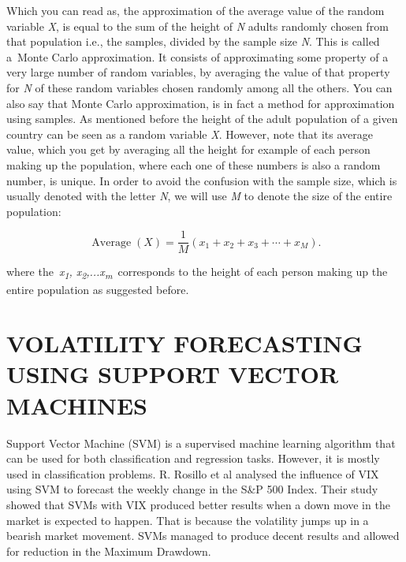 \documentclass[12pt,a4paper]{report}
\numberwithin{equation}{section}
\begin{document}
Which you can read as, the approximation of the average value of the
random variable \emph{X}, is equal to the sum of the height of \emph{N}
adults randomly chosen from that population i.e., the samples, divided
by the sample size \emph{N}. This is called a~Monte Carlo approximation.
It consists of approximating some property of a very large number of
random variables, by averaging the value of that property for \emph{N}
of these random variables chosen randomly among all the others. You can
also say that Monte Carlo approximation, is in fact a method for
approximation using samples. As mentioned before the height of the adult
population of a given country can be seen as a random variable \emph{X}.
However, note that its average value, which you get by averaging all the
height for example of each person making up the population, where each
one of these numbers is also a random number, is unique. In order to
avoid the confusion with the sample size, which is usually denoted with
the letter \emph{N}, we will use \emph{M} to denote the size of the
entire population:

\begin{equation}
\operatorname{Average}(X) = \frac{1}{M}\left(x_{1} + x_{2} + x_{3} + \cdots + x_{M}\right).
\label{eq:average-expanded}
\end{equation}



where the~\emph{x\textsubscript{1},
x\textsubscript{2},...x\textsubscript{m}}~corresponds to the height of
each person making up the entire population as suggested before.

\hypertarget{volatility--forecasting--using--support--vector--machines}{%
\section{\texorpdfstring{\textbf{VOLATILITY FORECASTING USING
SUPPORT VECTOR MACHINES}
}{VOLATILITY FORECASTING USING SUPPORT VECTOR MACHINES }}\label{volatility--forecasting--using--support--vector--machines}}

Support Vector Machine (SVM) is a supervised machine learning algorithm
that can be used for both classification and regression tasks. However,
it is mostly used in classification problems. R. Rosillo et al \cite{rosillo2014influence_44}
analysed the influence of VIX using SVM to forecast the weekly change in
the S\&P 500 Index. Their study showed that SVMs with VIX produced
better results when a down move in the market is expected to happen.
That is because the volatility jumps up in a bearish market movement.
SVMs managed to produce decent results and allowed for reduction in the
Maximum Drawdown.
\end{document}

